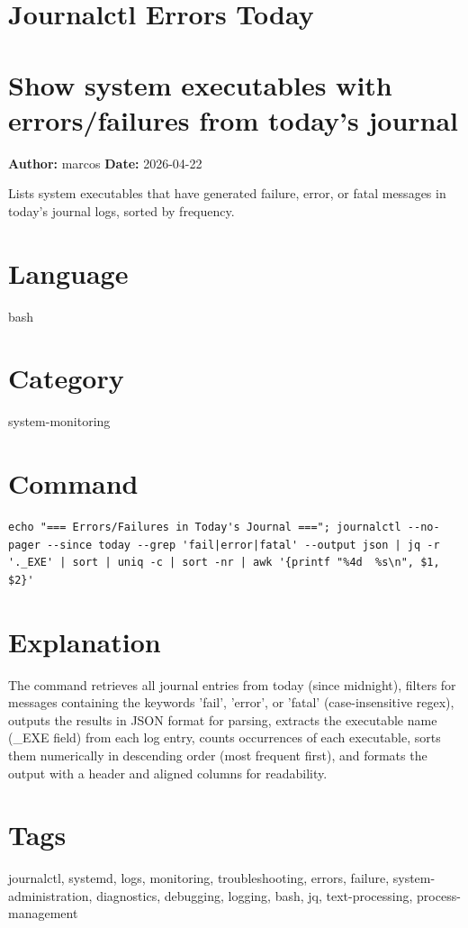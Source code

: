\documentclass[openany]{book}
\begin{document}
\section{Journalctl Errors Today}
\section*{Show system executables with errors/failures from today's journal}
\textbf{Author:} marcos \hfill \textbf{Date:} 2026-04-22

\noindent Lists system executables that have generated failure, error, or fatal messages in today's journal logs, sorted by frequency.

\section*{Language}
bash

\section*{Category}
system-monitoring

\section*{Command}
\begin{lstlisting}
echo "=== Errors/Failures in Today's Journal ==="; journalctl --no-pager --since today --grep 'fail|error|fatal' --output json | jq -r '._EXE' | sort | uniq -c | sort -nr | awk '{printf "%4d  %s\n", $1, $2}'
\end{lstlisting}

\section*{Explanation}
The command retrieves all journal entries from today (since midnight), filters for messages containing the keywords 'fail', 'error', or 'fatal' (case-insensitive regex), outputs the results in JSON format for parsing, extracts the executable name (\_EXE field) from each log entry, counts occurrences of each executable, sorts them numerically in descending order (most frequent first), and formats the output with a header and aligned columns for readability.

\section*{Tags}
journalctl, systemd, logs, monitoring, troubleshooting, errors, failure, system-administration, diagnostics, debugging, logging, bash, jq, text-processing, process-management
\end{document}
